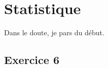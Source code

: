 \documentclass[11pt]{article}
\begin{document}

\newtheorem{Definition}{Définition}
\newtheorem{Theorem}{Théorème}
\newtheorem{Proposition}{Propriété}

\renewcommand{\labelitemi}{$\bullet$}
\renewcommand{\labelitemii}{$\circ$}

\setlength{\columnseprule}{1pt}

\section{Statistique}

Dans le doute, je pars du début.

\subsection{Exercice 6}
\end{document}
